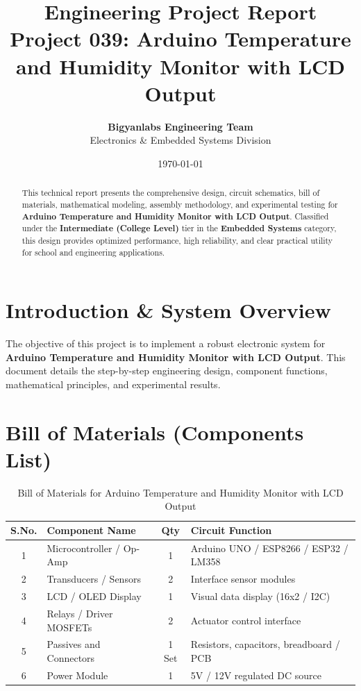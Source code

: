 \documentclass[11pt,a4paper]{article}
\title{\textbf{\Huge Engineering Project Report}\\[0.5em] \Large Project 039: Arduino Temperature and Humidity Monitor with LCD Output}
\author{\textbf{Bigyanlabs Engineering Team}\\ Electronics \& Embedded Systems Division}
\date{\today}
\begin{document}
\maketitle
\thispagestyle{empty}

\begin{abstract}
This technical report presents the comprehensive design, circuit schematics, bill of materials, mathematical modeling, assembly methodology, and experimental testing for \textbf{Arduino Temperature and Humidity Monitor with LCD Output}. Classified under the \textbf{Intermediate (College Level)} tier in the \textbf{Embedded Systems} category, this design provides optimized performance, high reliability, and clear practical utility for school and engineering applications.
\end{abstract}

\newpage
\tableofcontents
\newpage

\section{Introduction \& System Overview}
The objective of this project is to implement a robust electronic system for \textbf{Arduino Temperature and Humidity Monitor with LCD Output}. This document details the step-by-step engineering design, component functions, mathematical principles, and experimental results.

\section{Bill of Materials (Components List)}
\begin{table}[h!]
\centering
\caption{Bill of Materials for Arduino Temperature and Humidity Monitor with LCD Output}
\vspace{0.5em}
\begin{tabular}{clcp{7cm}}
\toprule
\textbf{S.No.} & \textbf{Component Name} & \textbf{Qty} & \textbf{Circuit Function} \\
\midrule
1 & Microcontroller / Op-Amp & 1 & Arduino UNO / ESP8266 / ESP32 / LM358 \\
2 & Transducers / Sensors & 2 & Interface sensor modules \\
3 & LCD / OLED Display & 1 & Visual data display (16x2 / I2C) \\
4 & Relays / Driver MOSFETs & 2 & Actuator control interface \\
5 & Passives and Connectors & 1 Set & Resistors, capacitors, breadboard / PCB \\
6 & Power Module & 1 & 5V / 12V regulated DC source \\
\bottomrule
\end{tabular}
\end{table}
\end{document}
